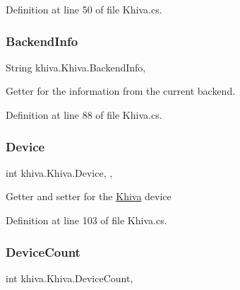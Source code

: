Definition at line 50 of file Khiva.\+cs.

\mbox{\label{classkhiva_1_1_khiva_ad5c8679d21f7397030d5dd273e40d2f3}} 
\subsubsection{\texorpdfstring{Backend\+Info}{BackendInfo}}
{\footnotesize\ttfamily String khiva.\+Khiva.\+Backend\+Info\hspace{0.3cm}{\ttfamily [static]}, {\ttfamily [get]}}



Getter for the information from the current backend. 



Definition at line 88 of file Khiva.\+cs.

\mbox{\label{classkhiva_1_1_khiva_a099fd26a65c0f76e4ae9e5cc3c63377e}} 
\subsubsection{\texorpdfstring{Device}{Device}}
{\footnotesize\ttfamily int khiva.\+Khiva.\+Device\hspace{0.3cm}{\ttfamily [static]}, {\ttfamily [get]}, {\ttfamily [set]}}



Getter and setter for the \mbox{\hyperlink{classkhiva_1_1_khiva}{Khiva}} device 



Definition at line 103 of file Khiva.\+cs.

\mbox{\label{classkhiva_1_1_khiva_add36612816a3c1921bea61c441833f46}} 
\subsubsection{\texorpdfstring{Device\+Count}{DeviceCount}}
{\footnotesize\ttfamily int khiva.\+Khiva.\+Device\+Count\hspace{0.3cm}{\ttfamily [static]}, {\ttfamily [get]}}



